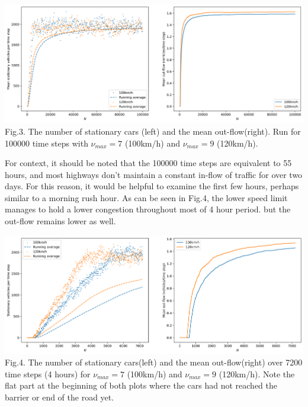 \documentclass[11pt]{article}
\begin{document}
	\begin{center}
		\includegraphics[scale=0.46]{Figures/Plain_bottleneck.png}\\
		Fig.3.	
		The number of stationary cars (left) and the mean out-flow(right). Run for 100000 time steps with $\nu_{max}=7$ (100km/h) and $\nu_{max}=9$ (120km/h). \\
	\end{center}

	For context, it should be noted that the 100000 time steps are equivalent to 55 hours, and most highways don't maintain a constant in-flow of traffic for over two days. For this reason, it would be helpful to examine the first few hours, perhaps similar to a morning rush hour. As can be seen in Fig.4, the lower speed limit manages to hold a lower congestion throughout most of 4 hour period. but the out-flow remains lower as well.\\
	
	\begin{center}
		\includegraphics[scale=0.46]{Figures/Plain_bottleneck_4hour.png}\\
		Fig.4.	
		The number of stationary cars(left) and the mean out-flow(right) over 7200 time steps (4 hours) for $\nu_{max}=7$ (100km/h) and $\nu_{max}=9$ (120km/h). Note the flat part at the beginning of both plots where the cars had not reached the barrier or end of the road yet. \\
	\end{center}
\end{document}
